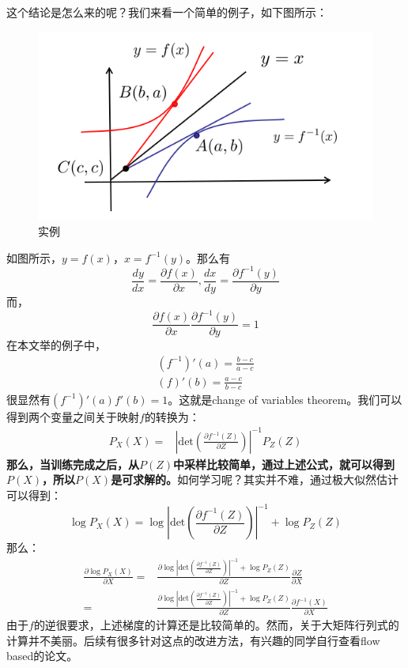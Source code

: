 \documentclass[a4paper]{article}
\begin{document}
这个结论是怎么来的呢？我们来看一个简单的例子，如下图所示：
\begin{figure}[H]
    \centering
    \includegraphics[width=.55\textwidth]{微信图片_20200629094542.png}
    \caption{实例}
    \label{fig:my_label_1}
\end{figure}
如图所示，$y=f(x)$，$x=f^{-1}(y)$。那么有
\begin{equation}
    \frac{dy}{dx} = \frac{\partial f(x)}{\partial x}, \frac{dx}{dy} = \frac{\partial f^{-1}(y)}{\partial y}
\end{equation}
而，
\begin{equation}
    \frac{\partial f(x)}{\partial x} \frac{\partial f^{-1}(y)}{\partial y} = 1
\end{equation}
在本文举的例子中，
\begin{equation}
\begin{split}
    (f^{-1})'(a) = \frac{b-c}{a-c} \\
    (f)'(b) = \frac{a-c}{b-c} 
\end{split}
\end{equation}
很显然有$(f^{-1})'(a) f'(b) = 1$。这就是change of
variables theorem。我们可以得到两个变量之间关于映射$f$的转换为：
\begin{equation}
    \begin{split}
         P_X(X) = & \left| \text{det}\left( \frac{\partial f^{-1}(Z)}{\partial Z} \right)  \right|^{-1}P_Z(Z)
    \end{split}
\end{equation}
\textbf{那么，当训练完成之后，从$P(Z)$中采样比较简单，通过上述公式，就可以得到$P(X)$，所以$P(X)$是可求解的。}如何学习呢？其实并不难，通过极大似然估计可以得到：
\begin{equation}
    \log P_X(X) = \log \left| \text{det}\left( \frac{\partial f^{-1}(Z)}{\partial Z} \right)  \right|^{-1} + \log P_Z(Z)
\end{equation}
那么：
\begin{equation}
\begin{split}
    \frac{\partial \log P_X(X)}{\partial X} = & \frac{\partial \log \left| \text{det}\left( \frac{\partial f^{-1}(Z)}{\partial Z} \right)  \right|^{-1} + \log P_Z(Z)}{ \partial Z} \frac{\partial Z}{ \partial X} \\
    = & \frac{\partial \log \left| \text{det}\left( \frac{\partial f^{-1}(Z)}{\partial Z} \right)  \right|^{-1} + \log P_Z(Z)}{ \partial Z} \frac{\partial f^{-1}(X)}{ \partial X}
\end{split}
\end{equation}
由于$f$的逆很要求，上述梯度的计算还是比较简单的。然而，关于大矩阵行列式的计算并不美丽。后续有很多针对这点的改进方法，有兴趣的同学自行查看flow based的论文。
\end{document}

